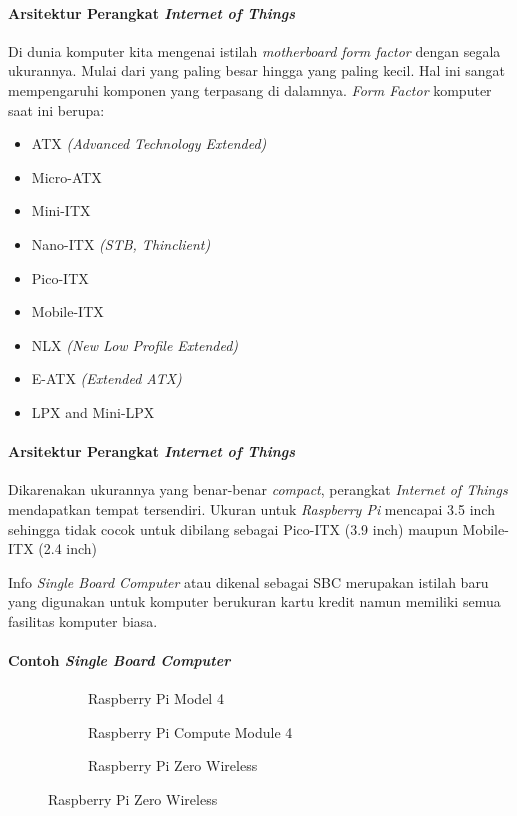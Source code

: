 \begin{frame}{\insertsectionhead}
	\framesubtitle{Arsitektur Perangkat \textit{Internet of Things}}
	\justifying
	Di dunia komputer kita mengenai istilah \textit{motherboard form factor} dengan segala ukurannya. Mulai dari yang paling besar hingga yang paling kecil. Hal ini sangat mempengaruhi komponen yang terpasang di dalamnya.
	\vfill
	\textit{Form Factor} komputer saat ini berupa:
	\begin{multicols}{2}
		\begin{itemize}
			\item ATX \textit{(Advanced Technology Extended)}
			\item Micro-ATX
			\item Mini-ITX
			\item Nano-ITX \textit{(STB, Thinclient)}
			\item Pico-ITX
			\item Mobile-ITX
			\item NLX \textit{(New Low Profile Extended)}
			\item E-ATX \textit{(Extended ATX)}
			\item LPX and Mini-LPX
		\end{itemize}
	\end{multicols}
\end{frame}
	
\begin{frame}{\insertsectionhead}
	\framesubtitle{Arsitektur Perangkat \textit{Internet of Things}}
	\justifying
	Dikarenakan ukurannya yang benar-benar \textit{compact}, perangkat \textit{Internet of Things} mendapatkan tempat tersendiri. Ukuran untuk \textit{Raspberry Pi} mencapai 3.5 inch sehingga tidak cocok untuk dibilang sebagai Pico-ITX (3.9 inch) maupun Mobile-ITX (2.4 inch)
	\vfill
	\begin{block}{Info}
		\textit{Single Board Computer} atau dikenal sebagai SBC merupakan istilah baru yang digunakan untuk komputer berukuran kartu kredit namun memiliki semua fasilitas komputer biasa.
	\end{block}
\end{frame}

\begin{frame}{\insertsectionhead}
	\framesubtitle{Contoh \textit{Single Board Computer}}
	\begin{figure}[ht!]
		\begin{subfigure}[b]{0.3\textwidth}
				\caption*{Raspberry Pi Model 4}
			\end{subfigure}
		\hspace{\fill}
		\begin{subfigure}[b]{0.3\textwidth}
				\caption*{Raspberry Pi Compute Module 4}
			\end{subfigure}
		\hspace{\fill}
		\begin{subfigure}[b]{0.35\textwidth}
				\caption*{Raspberry Pi Zero Wireless}
			\end{subfigure}
	\end{figure}
\end{frame}

